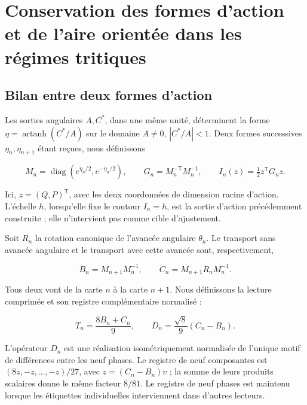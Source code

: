 \chapter{Conservation des formes d’action et de l’aire orientée dans les régimes tritiques}
\label{x_reciprocidad:nuclear:8}
\section{Bilan entre deux formes d’action}

Les sorties angulaires \(A,C^*\), dans une même unité, déterminent la forme \(\eta=\operatorname{artanh}(C^*/A)\) sur le domaine \(A\ne0\), \(|C^*/A|<1\). Deux formes successives \(\eta_n,\eta_{n+1}\) étant reçues, nous définissons

\[
M_n=\operatorname{diag}(e^{\eta_n/2},e^{-\eta_n/2}),\qquad
G_n=M_n^{-\mathsf T}M_n^{-1},\qquad
I_n(z)=\tfrac12z^\mathsf TG_nz.
\]

Ici, \(z=(Q,P)^\mathsf T\), avec les deux coordonnées de dimension racine d’action. L’échelle \(\hbar\), lorsqu’elle fixe le contour \(I_n=\hbar\), est la sortie d’action précédemment construite ; elle n’intervient pas comme cible d’ajustement.

Soit \(R_n\) la rotation canonique de l’avancée angulaire \(\theta_n\). Le transport sans avancée angulaire et le transport avec cette avancée sont, respectivement,

\begin{equation}
B_n=M_{n+1}M_n^{-1},\qquad
C_n=M_{n+1}R_nM_n^{-1}.
\label{x_reciprocidad:nuc08:eq:1}
\end{equation}

Tous deux vont de la carte \(n\) à la carte \(n+1\). Nous définissons la lecture comprimée et son registre complémentaire normalisé :

\begin{equation}
T_n=\frac{8B_n+C_n}{9},\qquad
D_n=\frac{\sqrt8}{9}(C_n-B_n).
\label{x_reciprocidad:nuc08:eq:2}
\end{equation}

L’opérateur \(D_n\) est une réalisation isométriquement normalisée de l’unique motif de différences entre les neuf phases. Le registre de neuf composantes est \((8z,-z,\ldots,-z)/27\), avec \(z=(C_n-B_n)v\) ; la somme de leurs produits scalaires donne le même facteur \(8/81\). Le registre de neuf phases est maintenu lorsque les étiquettes individuelles interviennent dans d’autres lecteurs.

